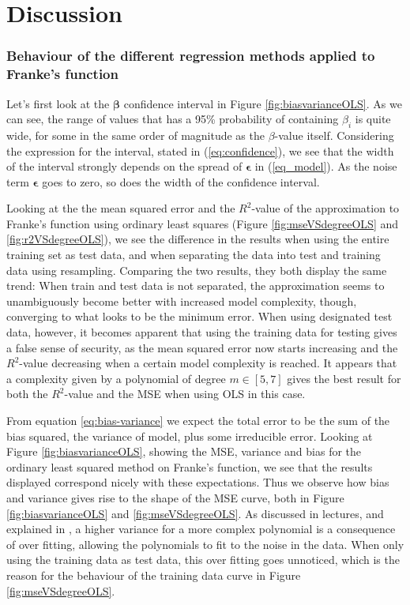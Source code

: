 \section{Discussion}
\label{sec:discussion}

\subsubsection*{Behaviour of the different regression methods applied to Franke's function}
Let's first look at the $\boldsymbol{\beta}$ confidence interval in Figure \ref{fig:biasvarianceOLS}. As we can see, the range of values that has a 95\% probability of containing $\beta_i$ is quite wide, for some in the same order of magnitude as the $\beta$-value itself. Considering the expression for the interval, stated in (\ref{eq:confidence}), we see that the width of the interval strongly depends on the spread of $\boldsymbol{\epsilon}$ in (\ref{eq_model}). As the noise term $\boldsymbol{\epsilon}$ goes to zero, so does the width of the confidence interval.

Looking at the  the mean squared error and the $R^2$-value of the approximation to Franke's function using ordinary least squares (Figure \ref{fig:mseVSdegreeOLS} and \ref{fig:r2VSdegreeOLS}), we see the difference in the results when using the entire training set as test data, and when separating the data into test and training data using resampling. Comparing the two results, they both display the same trend: When train and test data is not separated, the approximation seems to unambiguously become better with increased model complexity, though, converging to what looks to be the minimum error. When using designated test data, however, it becomes apparent that using the training data for testing gives a false sense of security, as the mean squared error now starts increasing and the $R^2$-value decreasing when a certain model complexity is reached. It appears that a complexity given by a polynomial of degree $m \in [5,7]$ gives the best result for both the $R^2$-value and the MSE when using OLS in this case.

From equation \eqref{eq:bias-variance} we expect the total error to be the sum of the bias squared, the variance of model, plus some irreducible error. Looking at Figure \ref{fig:biasvarianceOLS}, showing the MSE, variance and bias for the ordinary least squared method on Franke's function, we see that the results displayed correspond nicely with these expectations. Thus we observe how bias and variance gives rise to the shape of the MSE curve, both in Figure \ref{fig:biasvarianceOLS} and \ref{fig:mseVSdegreeOLS}. As discussed in lectures, and explained in \cite{hastie2009elements}, a higher variance for a more complex polynomial is a consequence of over fitting, allowing the polynomials to fit to the noise in the data. When only using the training data as test data, this over fitting goes unnoticed, which is the reason for the behaviour of the training data curve in Figure \ref{fig:mseVSdegreeOLS}.

